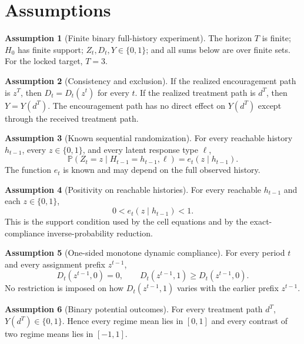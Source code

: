 \documentclass[11pt]{article}
\renewcommand{\Pr}{\mathbb{P}}
\theoremstyle{definition}
\newtheorem{assumption}{Assumption}
\theoremstyle{plain}
\theoremstyle{remark}
\begin{document}
\section{Assumptions}
\begin{assumption}[Finite binary full-history experiment]\label{ass:s0-finite}
The horizon \(T\) is finite; \(H_0\) has finite support; \(Z_t,D_t,Y\in\{0,1\}\); and all sums below are over finite sets.  For the locked target, \(T=3\).
\end{assumption}

\begin{assumption}[Consistency and exclusion]\label{ass:s0-consistency}
If the realized encouragement path is \(z^T\), then \(D_t=D_t(z^t)\) for every \(t\).  If the realized treatment path is \(d^T\), then \(Y=Y(d^T)\).  The encouragement path has no direct effect on \(Y(d^T)\) except through the received treatment path.
\end{assumption}

\begin{assumption}[Known sequential randomization]\label{ass:s0-randomization}
For every reachable history \(h_{t-1}\), every \(z\in\{0,1\}\), and every latent response type \(\ell\),
\[
\Pr(Z_t=z\mid H_{t-1}=h_{t-1},\ell)=e_t(z\mid h_{t-1}).
\]
The function \(e_t\) is known and may depend on the full observed history.
\end{assumption}

\begin{assumption}[Positivity on reachable histories]\label{ass:s0-positivity}
For every reachable \(h_{t-1}\) and each \(z\in\{0,1\}\),
\[
0<e_t(z\mid h_{t-1})<1.
\]
This is the support condition used by the cell equations and by the exact-compliance inverse-probability reduction.
\end{assumption}

\begin{assumption}[One-sided monotone dynamic compliance]\label{ass:s0-one-sided}
For every period \(t\) and every assignment prefix \(z^{t-1}\),
\[
D_t(z^{t-1},0)=0,\qquad D_t(z^{t-1},1)\ge D_t(z^{t-1},0).
\]
No restriction is imposed on how \(D_t(z^{t-1},1)\) varies with the earlier prefix \(z^{t-1}\).
\end{assumption}

\begin{assumption}[Binary potential outcomes]\label{ass:s0-binary-y}
For every treatment path \(d^T\), \(Y(d^T)\in\{0,1\}\).  Hence every regime mean lies in \([0,1]\) and every contrast of two regime means lies in \([-1,1]\).
\end{assumption}
\end{document}
